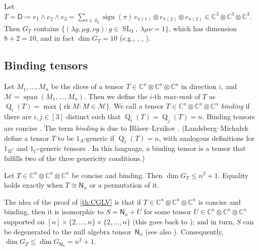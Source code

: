 \documentclass[11pt,a4paper]{article}
\numberwithin{equation}{section}
\newcommand{\CC}{\mathbb{C}}
\DeclareMathOperator{\Q}{Q}
\DeclareMathOperator{\SL}{SL}
\DeclareMathOperator{\linspan}{span}
\DeclareMathOperator{\rk}{rk}
\DeclareMathOperator{\sign}{sign}
\begin{document}
\begin{example}\label{ex:skew}
	Let
    $T = \mathsf{D} \coloneqq e_1 \wedge e_2 \wedge e_3 = \sum_{\pi \in S_3} \sign(\pi)\, e_{\pi(1)} \otimes e_{\pi(2)} \otimes e_{\pi(3)} \in \CC^3 \otimes \CC^3 \otimes \CC^3.$
    Then $G_T$ contains $\{(\lambda g, \mu g, \nu g) : g \in \SL_3, \ \lambda \mu \nu = 1\}$, which has dimension $8 + 2 = 10$, and in fact  $\dim G_T = 10$ (e.g., \cite[Table~3]{MR1773770}, \cite[Remark~3.4]{conner2021tensorsmaximalsymmetries}, \cite[\S7.1]{MR4644081}). %
\end{example}

%
%
%
%
%





%
%
%
%

\subsection{Binding tensors}

Let $M_1,\dots,M_n$ be the slices of a tensor $T\in \CC^n \otimes \CC^n \otimes \CC^n$ in direction $i$, and $\mathcal{M}=\linspan(M_1,\dots,M_n)$. Then we define the $i$-th \emph{max-rank} of $T$ as $\Q_i(T)= \max \{ \rk M: M \in \mathcal{M} \}$.
%
We call a tensor $T\in \CC^n \otimes \CC^n \otimes \CC^n$ \emph{binding} if there are $i,j\in[3]$ distinct such that $\Q_i(T)=\Q_j(T)=n$. 
%
%
Binding tensors are %
concise \cite{conner2021tensorsmaximalsymmetries}. The term \emph{binding} is due to Bl\"aser--Lysikov \cite{blaeser-lysikov}. (Landsberg--Micha{\l}ek define a tensor $T$ to be $1_A$-generic if $\Q_1(T)=n$, with analogous definitions for $1_B$- and $1_C$-generic tensors \cite{MR3682743}. In this language, a binding tensor is a tensor that fulfills two of the three genericity conditions.) %
%

\begin{theorem}\label{th:CGLV}
Let $T \in \CC^n \otimes \CC^n \otimes \CC^n$ be concise and binding. Then $\dim G_T \leq n^2 + 1$. Equality holds exactly when $T \cong \mathsf{N}_n$ or a permutation of it.
\end{theorem}

The idea of the proof of \cref{th:CGLV} is that if $T \in \CC^n \otimes \CC^n \otimes \CC^n$ is concise and binding, then it is isomorphic to 
$S = \mathsf{N}_n + U$ %
for some tensor $U \in \CC^n \otimes \CC^n \otimes \CC^n$ supported on $[n] \times \{2,\ldots, n\} \times \{2, \ldots, n\}$ (this goes back to \cite{blaeser-lysikov});
and in turn, $S$ can be degenerated to the null algebra tensor~$\mathsf{N}_n$ (see also \cite{gesmundo-zuiddam}). Consequently, $\dim G_T \leq \dim G_{\mathsf{N}_n} = n^2+1$.
\end{document}
